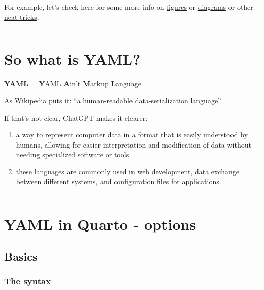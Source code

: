\documentclass[
  letterpaper,
  DIV=11,
  numbers=noendperiod]{scrartcl}
\begin{document}
For example, let's check here for some more info on
\href{https://quarto.org/docs/authoring/figures.html}{figures} or
\href{https://quarto.org/docs/authoring/diagrams.html}{diagrams} or
other \href{https://quarto.org/docs/authoring/notebook-embed.html}{neat
tricks}.

\begin{center}\rule{0.5\linewidth}{0.5pt}\end{center}

\hypertarget{so-what-is-yaml}{%
\section{So what is YAML?}\label{so-what-is-yaml}}

\href{https://yaml.org/}{\textbf{YAML}} = \textbf{Y}AML \textbf{A}in't
\textbf{M}arkup \textbf{L}anguage

As Wikipedia puts it: ``a human-readable data-serialization language''.

If that's not clear, ChatGPT makes it clearer:

\begin{enumerate}
\def\labelenumi{\arabic{enumi})}
\item
  a way to represent computer data in a format that is easily understood
  by humans, allowing for easier interpretation and modification of data
  without needing specialized software or tools
\item
  these languages are commonly used in web development, data exchange
  between different systems, and configuration files for applications.
\end{enumerate}

\begin{center}\rule{0.5\linewidth}{0.5pt}\end{center}

\hypertarget{yaml-in-quarto---options}{%
\section{YAML in Quarto - options}\label{yaml-in-quarto---options}}

\hypertarget{basics}{%
\subsection{Basics}\label{basics}}

\hypertarget{the-syntax}{%
\subsubsection{The syntax}\label{the-syntax}}
\end{document}

